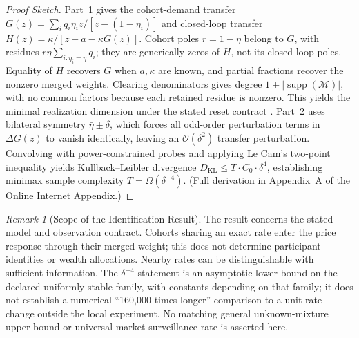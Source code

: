 \documentclass[12pt]{article}
\theoremstyle{definition}
\theoremstyle{remark}
\newtheorem{remark}[theorem]{Remark}
\begin{document}
\begin{proof}[Proof Sketch]
Part~1 gives the cohort-demand transfer $G(z)=\sum_i q_i\eta_i z/[z-(1-\eta_i)]$ and closed-loop transfer $H(z)=\kappa/[z-a-\kappa G(z)]$. Cohort poles $r=1-\eta$ belong to $G$, with residues $r\eta\sum_{i:\eta_i=\eta}q_i$; they are generically zeros of $H$, not its closed-loop poles. Equality of $H$ recovers $G$ when $a,\kappa$ are known, and partial fractions recover the nonzero merged weights. Clearing denominators gives degree $1+|\operatorname{supp}(\mathcal M)|$, with no common factors because each retained residue is nonzero. This yields the minimal realization dimension under the stated reset contract \citep{kalman1960}. Part~2 uses bilateral symmetry $\bar{\eta} \pm \delta$, which forces all odd-order perturbation terms in $\Delta G(z)$ to vanish identically, leaving an $\mathcal{O}(\delta^2)$ transfer perturbation. Convolving with power-constrained probes and applying Le Cam's two-point inequality \citep{lecam1986} yields Kullback--Leibler divergence $D_{\text{KL}} \le T \cdot C_0 \cdot \delta^4$, establishing minimax sample complexity $T = \Omega(\delta^{-4})$. (Full derivation in Appendix~A of the Online Internet Appendix.)
\end{proof}

\begin{remark}[Scope of the Identification Result]
The result concerns the stated model and observation contract. Cohorts sharing an exact rate enter the price response through their merged weight; this does not determine participant identities or wealth allocations. Nearby rates can be distinguishable with sufficient information. The $\delta^{-4}$ statement is an asymptotic lower bound on the declared uniformly stable family, with constants depending on that family; it does not establish a numerical ``160,000 times longer'' comparison to a unit rate change outside the local experiment. No matching general unknown-mixture upper bound or universal market-surveillance rate is asserted here.
\end{remark}
\end{document}
